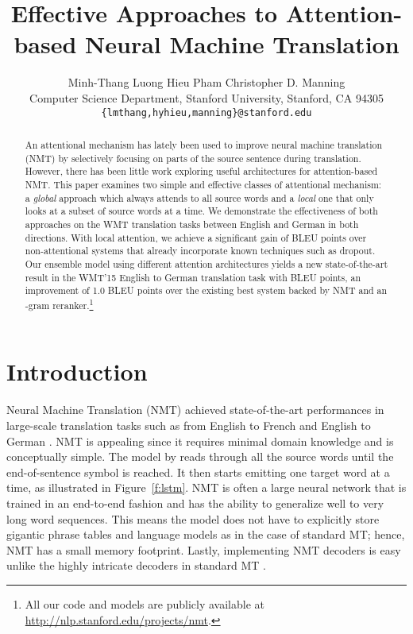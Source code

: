 \documentclass[11pt,a4paper]{article}
\title{Effective Approaches to Attention-based Neural Machine Translation}
\author{Minh-Thang Luong    Hieu Pham    Christopher D. Manning\\
  Computer Science Department, Stanford University, Stanford, CA 94305 \\
  {\tt \{lmthang,hyhieu,manning\}@stanford.edu} 
}
\date{}
\begin{document}
\maketitle
\begin{abstract}
An attentional mechanism has lately been used to improve neural machine translation (NMT)
by
selectively focusing on parts of the source sentence during translation. However,
there has been little work exploring useful architectures for attention-based
NMT. This paper examines two simple and effective classes of attentional
mechanism: a {\it global} approach which always attends to all source words and
a {\it local} one that only looks at a subset of source words at a time. 
We demonstrate the effectiveness of both approaches on the WMT translation
tasks between English and German in both directions. With local
attention, we achieve a significant gain of \attngain{} BLEU points over
non-attentional systems that 
already incorporate known techniques such as dropout. Our ensemble 
model using different attention architectures yields a new
state-of-the-art result in the WMT'15 English to German
translation task with \sotanew{} BLEU points, an improvement of 1.0 BLEU points over the existing
best system backed by NMT and an -gram reranker.\footnote{All our code and models
are publicly available at \url{http://nlp.stanford.edu/projects/nmt}.}


\end{abstract}

\section{Introduction}
\label{sec:intro}
Neural Machine Translation (NMT) achieved state-of-the-art performances in
large-scale translation tasks such as from English to French \cite{luong15} and
English to German \cite{jean15}. NMT is appealing since it requires minimal
domain knowledge and is conceptually simple. The model by  reads through all the source words until the end-of-sentence symbol \eos{} is reached. It then starts emitting one target word at a time, as illustrated in Figure~\ref{f:lstm}. NMT is often a large neural network that is trained in an end-to-end fashion and has the ability to generalize well to very long word sequences. This means the model does not have to explicitly store gigantic phrase tables and language models as in the case of standard MT; hence, NMT has a small memory footprint. Lastly, implementing NMT decoders is easy unlike the highly intricate decoders in standard MT \cite{Koehn:2003:SMT}.
\end{document}
